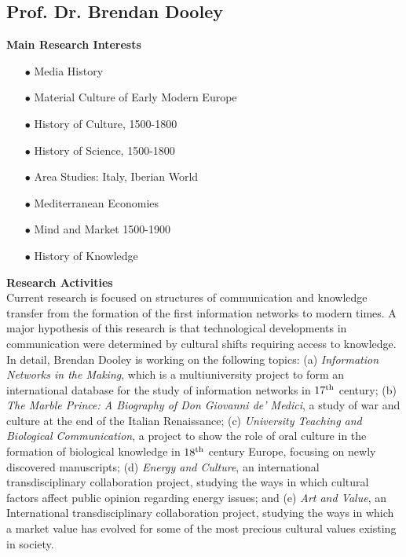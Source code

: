 \subsection{Prof. Dr. Brendan Dooley}


\textbf{Main Research Interests}\\[-0.25cm]
\begin{enumerate}
\item[$\bullet$]	Media History
\item[$\bullet$]	Material Culture of Early Modern Europe
\item[$\bullet$]	History of Culture, 1500-1800
\item[$\bullet$]	History of Science, 1500-1800
\item[$\bullet$]	Area Studies: Italy, Iberian World
\item[$\bullet$]	Mediterranean Economies
\item[$\bullet$]	Mind and Market 1500-1900
\item[$\bullet$]	History of Knowledge
\end{enumerate}


\vspace{0.6cm}
\textbf{Research Activities}\\[-0.25cm]

Current research is focused on structures of communication and knowledge transfer from the formation of the first information networks to modern times. A major hypothesis of this research is that technological developments in communication were determined by cultural shifts requiring access to knowledge. In detail, Brendan Dooley is working on the following topics: (a) \textit{Information Networks in the Making}, which is a multiuniversity project to form an international database for the study of information networks in $17^{\rm th}$ century; (b) \textit{The Marble Prince: A Biography of Don Giovanni de' Medici}, a study of war and culture at the end of the Italian Renaissance; (c) \textit{University Teaching and Biological Communication}, a project to show the role of oral culture in the formation of biological knowledge in $18^{\rm th}$ century Europe, focusing on newly discovered manuscripts; (d) \textit{Energy and Culture}, an international transdisciplinary collaboration project, studying the ways in which cultural factors affect public opinion regarding energy issues; and (e) \textit{Art and Value}, an International transdisciplinary collaboration project, studying the ways in which a market value has evolved for some of the most precious cultural values existing in society. 

